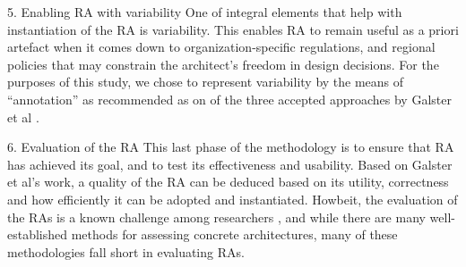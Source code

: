 \documentclass[conference]{IEEEtran}
\begin{document}
\begin{LaTeXdescription}



\item[5. Enabling RA with variability] One of integral elements that help with instantiation of the RA is variability. This enables RA to remain useful as a priori artefact when it comes down to organization-specific regulations, and regional policies that may constrain the architect's freedom in design decisions. For the purposes of this study, we chose to represent variability by the means of ``annotation'' as recommended as on of the three accepted approaches by Galster et al \cite{GALSTER}.






\item[6. Evaluation of the RA] This last phase of the methodology is to ensure that RA has achieved its goal, and to test its effectiveness and usability. Based on Galster et al's \cite{GALSTER} work, a quality of the RA can be deduced based on its utility, correctness and how efficiently it can be adopted and instantiated. Howbeit, the evaluation of the RAs is a known challenge among researchers \cite{Avgeriou}, and while there are many well-established methods for assessing concrete architectures, many of these methodologies fall short in evaluating RAs. 


\end{LaTeXdescription}
\end{document}
